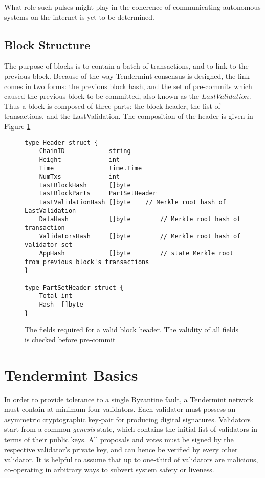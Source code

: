 What role such pulses might play in the coherence of communicating autonomous systems on the internet is yet to be determined.

\subsection{Block Structure}

The purpose of blocks is to contain a batch of transactions, and to link to the previous block.
Because of the way Tendermint consensus is designed, the link comes in two forms: the previous block hash,
and the set of pre-commits which caused the previous block to be committed, also known as the $LastValidation$.
Thus a block is composed of three parts: the block header, the list of transactions, and the LastValidation.
The composition of the header is given in Figure \ref{fig:header}

\begin{figure}[]
\begin{verbatim}
type Header struct {
	ChainID            string        
	Height             int           
	Time               time.Time     
	NumTxs             int           
	LastBlockHash      []byte        
	LastBlockParts     PartSetHeader 
	LastValidationHash []byte	 // Merkle root hash of LastValidation
	DataHash           []byte        // Merkle root hash of transaction 
	ValidatorsHash     []byte        // Merkle root hash of validator set
	AppHash            []byte        // state Merkle root from previous block's transactions
}

type PartSetHeader struct {
	Total int    
	Hash  []byte 
}
\end{verbatim}
	\caption[Block Header Structure]{The fields required for a valid block header. The validity of all fields is checked before pre-commit}
	\label{fig:header}
\end{figure}

\section{Tendermint Basics}

In order to provide tolerance to a single Byzantine fault, a Tendermint network must contain at minimum four validators.
Each validator must possess an asymmetric cryptographic key-pair for producing digital signatures.
Validators start from a common \emph{genesis} state, which contains the initial list of validators in terms of their public keys.
All proposals and votes must be signed by the respective validator's private key, and can hence be verified by every other validator.
It is helpful to assume that up to one-third of validators are malicious, co-operating in arbitrary ways to subvert system safety or liveness.

